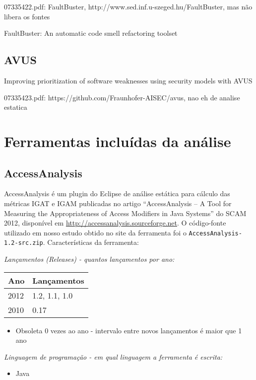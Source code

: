 07335422.pdf: FaultBuster, http://www.sed.inf.u-szeged.hu/FaultBuster, mas não libera os fontes

FaultBuster: An automatic code smell refactoring toolset

\subsection{AVUS}

Improving prioritization of software weaknesses using security models with AVUS

07335423.pdf: https://github.com/Fraunhofer-AISEC/avus, nao eh de analise estatica


\section{Ferramentas incluídas da análise}

\subsection{AccessAnalysis}

AccessAnalysis é um plugin do Eclipse de análise estática 
para cálculo das métricas IGAT e IGAM
publicadas no artigo ``AccessAnalysis -- A Tool for Measuring the
Appropriateness of Access Modifiers in Java Systems'' do SCAM 2012,
disponível em \url{http://accessanalysis.sourceforge.net}. O código-fonte
utilizado em nosso estudo obtido no site da ferramenta foi o
\texttt{AccessAnalysis-1.2-src.zip}. Características da ferramenta:

\begin{description}

  \item {\it Lançamentos ({\it Releases}) - quantos lançamentos por ano:}
    \begin{table}[h!]
      \centering
      \begin{tabular}{| l | l |}
        \hline
        Ano  & Lançamentos    \\
        \hline
        2012 & 1.2, 1.1, 1.0  \\
        2010 & 0.17           \\
        \hline
      \end{tabular}
    \end{table}
    \begin{itemize}
      \item Obsoleta 0 vezes ao ano - intervalo entre novos lançamentos é maior que 1 ano
    \end{itemize}

  \item {\it Linguagem de programação - em qual linguagem a ferramenta é escrita:}
    \begin{itemize}
      \item Java
    \end{itemize}

\end{description}


